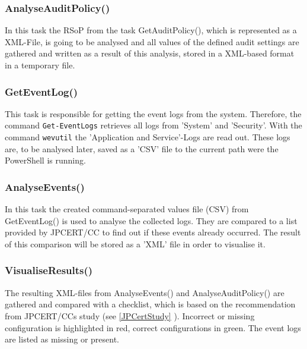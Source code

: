 \subsubsection{AnalyseAuditPolicy()}
In this task the RSoP from the task GetAuditPolicy(), which is represented as a XML-File, is going to be analysed and all values of the defined audit settings are gathered and written as a result of this analysis, stored in a XML-based format in a temporary file.

\subsubsection{GetEventLog()}
This task is responsible for getting the event logs from the system. Therefore, the command \lstinline|Get-EventLogs| \cite{Get-EventLogs} retrieves all logs from 'System' and 'Security'. With the command \lstinline|wevutil| the 'Application and Service'-Logs are read out. These logs are, to be analysed later, saved as a 'CSV' file to the current path were the PowerShell is running.

\subsubsection{AnalyseEvents()}
In this task the created command-separated values file (CSV) from GetEventLog() is used to analyse the collected logs. They are compared to a list provided by JPCERT/CC to find out if these events already occurred. The result of this comparison will be stored as a 'XML' file in order to visualise it.

\subsubsection{VisualiseResults()}
The resulting XML-files from AnalyseEvents() and AnalyseAuditPolicy() are gathered and compared with a checklist, which is based on the recommendation from JPCERT/CCs study (see \ref{JPCertStudy} ). Incorrect or missing configuration is highlighted in red, correct configurations in green. The event logs are listed as missing or present.

